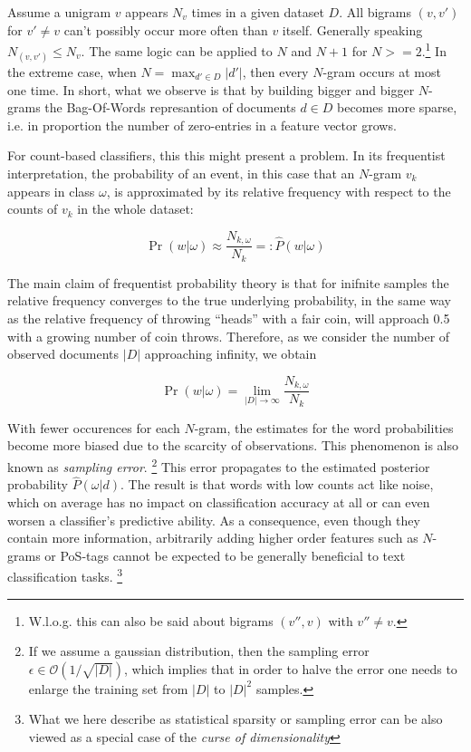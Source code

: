 Assume a unigram $v$ appears $N_v$ times in a given dataset $D$. All bigrams
$(v,v')$ for $v' \neq v$ can't possibly occur more often than  $v$ itself.
Generally speaking $N_{(v,v')} \leq N_v$. 
The same logic can be applied to $N$ and $N+1$ for $N >= 2$.\footnote{W.l.o.g.
this can also be said about bigrams $(v'',v)$ with $v '' \neq v$.} In the
extreme case, when $N = \max_{d' \in D} |d'|$, then every $N$-gram occurs at most one time. In short,
what we observe is that by building bigger and bigger $N$-grams the
Bag-Of-Words represantion of documents $d \in D$ becomes more sparse, i.e. in
proportion the number of zero-entries in a feature vector grows. 

For count-based classifiers, this this might present a problem. In its
frequentist interpretation, the probability of an event, in this case that an 
$N$-gram $v_k$ appears in class $\omega$, is approximated by
its relative frequency with respect to the counts of $v_k$ in the whole dataset: 

\begin{equation}
	\Pr(w|\omega) \approx \frac{N_{k,\omega}}{N_k} =:
	\hat{P}(w|\omega)
\end{equation}

The main claim of frequentist probability theory is that for inifnite samples
the relative frequency converges to the true underlying probability, in the same 
way as the relative frequency of throwing ``heads'' with a fair coin, will
approach 0.5 with a growing number of coin throws. Therefore, as we consider the
number of observed documents $|D|$ approaching infinity, we obtain 

\begin{equation} 
	\Pr(w|\omega) = \lim_{|D| \to \infty} \frac{N_{k,\omega}}{N_k}
\end{equation}

With fewer occurences for each $N$-gram, the estimates for the word probabilities
become more biased due to the scarcity of observations. This phenomenon is also
known as \emph{sampling error}. \footnote{If we assume a
gaussian distribution, then the sampling error $\epsilon \in
\mathcal{O}(1/\sqrt{|D|})$, which implies that in order to halve the error one
needs to enlarge the training set from $|D|$ to $|D|^2$ samples.} This error
propagates to the estimated posterior probability $\hat{P}(\omega|d)$.
The result is that words with low counts act like noise, which on average has no
impact on classification accuracy at all or can even worsen a classifier's
predictive ability. As a consequence, even though they contain more
information, arbitrarily adding higher order features such as $N$-grams or
PoS-tags cannot be expected to be generally beneficial to text classification
tasks. \footnote{What we here describe as statistical sparsity or sampling
error can be also viewed as a special case of the \emph{curse of
dimensionality}}

